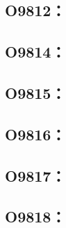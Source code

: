 \subsection{O9812：}



\clearpage
\subsection{O9814：}



\clearpage
\subsection{O9815：}



\clearpage
\subsection{O9816：}



\clearpage
\subsection{O9817：}



\clearpage
\subsection{O9818：}



